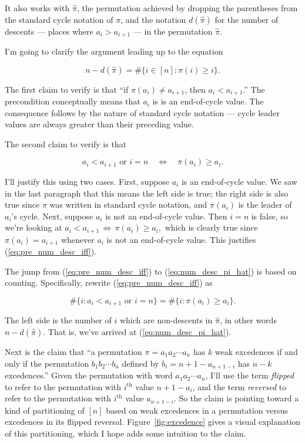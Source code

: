 \documentclass[]{article}
\begin{document}
It also works with \(\hat\pi\), the permutation achieved by dropping the
parentheses from the standard cycle notation of \(\pi\), and the
notation \(d(\hat\pi)\) for the number of descents --- places where
\(a_i > a_{i+1}\) --- in the permutation \(\hat\pi\).

I'm going to clarify the argument leading up to the equation

\begin{equation}n-d(\hat\pi) = \#\{i\in[n]:\pi(i)\ge i\}.\label{eq:num_desc_pi_hat}\end{equation}

The first claim to verify is that ``if \(\pi(a_i)\ne a_{i+1}\), then
\(a_i<a_{i+1}\).'' The precondition conceptually means that \(a_i\) is
is an end-of-cycle value. The consequence follows by the nature of
standard cycle notation --- cycle leader values are always greater than
their preceding value.

The second claim to verify is that

\begin{equation}a_i<a_{i+1}\text{ or }i=n \quad\Leftrightarrow\quad \pi(a_i)\ge a_i.\label{eq:pre_num_desc_iff}\end{equation}

I'll justify this using two cases. First, suppose \(a_i\) is an
end-of-cycle value. We saw in the last paragraph that this means the
left side is true; the right side is also true since \(\pi\) was written
in standard cycle notation, and \(\pi(a_i)\) is the leader of \(a_i\)'s
cycle. Next, suppose \(a_i\) is not an end-of-cycle value. Then \(i=n\)
is false, so we're looking at
\(a_i<a_{i+1}\,\Leftrightarrow\,\pi(a_i)\ge a_i,\) which is clearly true
since \(\pi(a_i) = a_{i+1}\) whenever \(a_i\) is not an end-of-cycle
value. This justifies (\ref{eq:pre_num_desc_iff}).

The jump from (\ref{eq:pre_num_desc_iff}) to (\ref{eq:num_desc_pi_hat})
is based on counting. Specifically, rewrite (\ref{eq:pre_num_desc_iff})
as

\[\#\{i:a_i<a_{i+1}\text{ or }i=n\} = \#\{i:\pi(a_i)\ge a_i\}.\]

The left side is the number of \(i\) which are non-descents in
\(\hat\pi\), in other words \(n - d(\hat\pi)\). That is, we've arrived
at (\ref{eq:num_desc_pi_hat}).

Next is the claim that ``a permutation \(\pi=a_1a_2\cdots a_n\) has
\(k\) weak excedences if and only if the permutation
\(b_1b_2\cdots b_n\) defined by \(b_i = n+1-a_{n+1-i}\) has \(n-k\)
excedences.'' Given the permutation with word \(a_1a_2\cdots a_n\), I'll
use the term \emph{flipped} to refer to the permutation with
\(i^\text{th}\) value \(n+1-a_i\), and the term \emph{reversed} to refer
to the permutation with \(i^\text{th}\) value \(a_{n+1-i}\). So the
claim is pointing toward a kind of partitioning of \([n]\) based on weak
excedences in a permutation versus excedences in its flipped reversal.
Figure~\ref{fig:excedence} gives a visual explanation of this
partitioning, which I hope adds some intuition to the claim.
\end{document}

